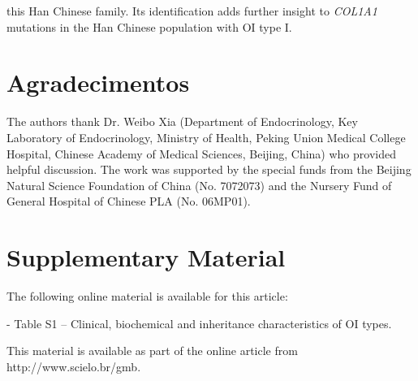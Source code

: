 this Han Chinese family. Its identification adds further insight to \textit{COL1A1} mutations in the Han Chinese population with OI type I.
\section*{Agradecimentos}
\par The authors thank Dr. Weibo Xia (Department of Endocrinology, Key Laboratory of Endocrinology, Ministry of Health, Peking Union Medical College Hospital, Chinese Academy of Medical Sciences, Beijing, China) who provided helpful discussion. The work was supported by the special funds from the Beijing Natural Science Foundation of China (No. 7072073) and the Nursery Fund of General Hospital of Chinese PLA (No. 06MP01).

\section*{Supplementary Material}
\par The following online material is available for this article: \par - Table S1 – Clinical, biochemical and inheritance characteristics of OI types.
\par This material is available as part of the online article from http://www.scielo.br/gmb.

